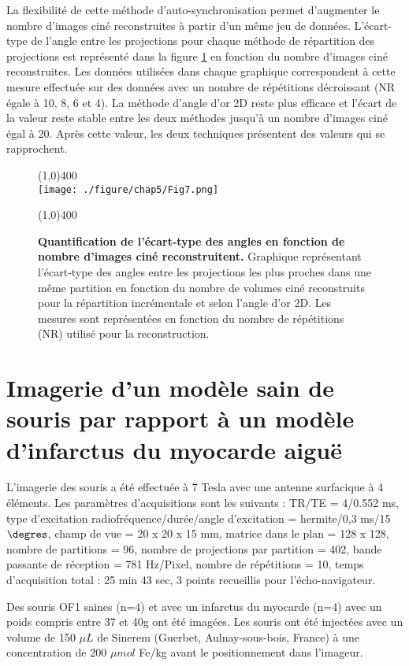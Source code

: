 La flexibilité de cette méthode d'auto-synchronisation permet d'augmenter le nombre d'images ciné reconstruites à partir d'un même jeu de données. L'écart-type de l'angle entre les projections pour chaque méthode de répartition des projections est représenté dans la figure \ref{fig:GoldVSIncNCine} en fonction du nombre d'images ciné reconstruites. Les données utilisées dans chaque graphique correspondent à cette mesure effectuée sur des données avec un nombre de répétitions décroissant (NR égale à 10, 8, 6 et 4). La méthode d'angle d'or 2D reste plus efficace et l'écart de la valeur reste stable entre les deux méthodes jusqu'à un nombre d'images ciné égal à 20. Après cette valeur, les deux techniques présentent des valeurs qui se rapprochent.

\begin{figure}[H]
\centering
\line(1,0){400} \\
\texttt{[image: ./figure/chap5/Fig7.png]}
\caption[Quantification de l'écart-type des angles en fonction de nombre d'images ciné reconstruitent.]{\label{fig:GoldVSIncNCine} \textbf{Quantification de l'écart-type des angles en fonction de nombre d'images ciné reconstruitent.} Graphique représentant  l'écart-type des angles entre les projections les plus proches dans une même partition en fonction du nombre de volumes ciné reconstruits pour la répartition incrémentale et selon l'angle d'or 2D. Les mesures sont représentées en fonction du nombre de répétitions (NR) utilisé pour la reconstruction.}
\line(1,0){400} \\ 
\end{figure}

\section{Imagerie d'un modèle sain de souris par rapport à un modèle d'infarctus du myocarde aiguë}

L'imagerie des souris a été effectuée à 7 Tesla avec une antenne surfacique à 4 éléments. Les paramètres d'acquisitions sont les suivants :
TR/TE = 4/0.552 ms, type d'excitation radiofréquence/durée/angle d'excitation = hermite/0,3 ms/15$\degres$, champ de vue = 20 x 20 x 15 mm, matrice dans le plan = 128 x 128, nombre de partitions = 96, nombre de projections par partition = 402, bande passante de réception = 781 Hz/Pixel, nombre de répétitions = 10, temps d'acquisition total : 25 min 43 sec, 3 points recueillis pour l'écho-navigateur.

Des souris OF1 saines (n=4) et avec un infarctus du myocarde (n=4) avec un poids compris entre 37 et 40g ont été imagées. Les souris ont été injectées avec un volume de 150 $\mu L$ de Sinerem (Guerbet, Aulnay-sous-bois, France) à une concentration de 200 $\mu mol$ Fe/kg avant le positionnement dans l'imageur.

